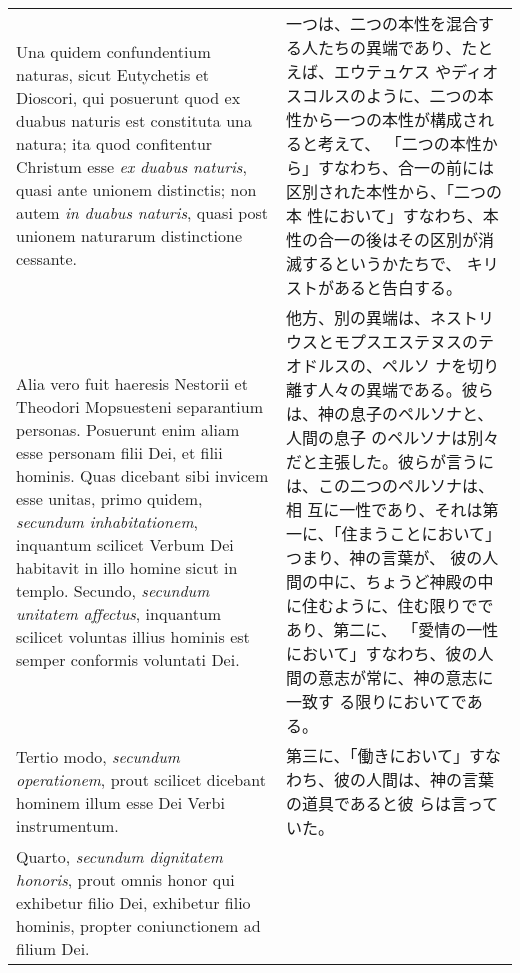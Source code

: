 \documentclass[10pt]{jsarticle} %
\begin{document}
\begin{longtable}{p{21em}p{21em}}
\\

Una quidem confundentium naturas, sicut Eutychetis et Dioscori, qui
posuerunt quod ex duabus naturis est constituta una natura; ita quod
confitentur Christum esse {\itshape ex duabus naturis}, quasi ante
unionem distinctis; non autem {\itshape in duabus naturis}, quasi post
unionem naturarum distinctione cessante.

&

一つは、二つの本性を混合する人たちの異端であり、たとえば、エウテュケス
やディオスコルスのように、二つの本性から一つの本性が構成されると考えて、
「二つの本性から」すなわち、合一の前には区別された本性から、「二つの本
性において」すなわち、本性の合一の後はその区別が消滅するというかたちで、
キリストがあると告白する。

\\

Alia vero fuit haeresis Nestorii et Theodori Mopsuesteni separantium
personas. Posuerunt enim aliam esse personam filii Dei, et filii
hominis. Quas dicebant sibi invicem esse unitas, primo quidem,
{\itshape secundum inhabitationem}, inquantum scilicet Verbum Dei
habitavit in illo homine sicut in templo. Secundo, {\itshape secundum
unitatem affectus}, inquantum scilicet voluntas illius hominis est
semper conformis voluntati Dei.


&

他方、別の異端は、ネストリウスとモプスエステヌスのテオドルスの、ペルソ
ナを切り離す人々の異端である。彼らは、神の息子のペルソナと、人間の息子
のペルソナは別々だと主張した。彼らが言うには、この二つのペルソナは、相
互に一性であり、それは第一に、「住まうことにおいて」つまり、神の言葉が、
彼の人間の中に、ちょうど神殿の中に住むように、住む限りでであり、第二に、
「愛情の一性において」すなわち、彼の人間の意志が常に、神の意志に一致す
る限りにおいてである。

\\

Tertio modo, {\itshape secundum operationem}, prout scilicet dicebant
hominem illum esse Dei Verbi instrumentum.



&


第三に、「働きにおいて」すなわち、彼の人間は、神の言葉の道具であると彼
らは言っていた。

\\

Quarto, {\itshape secundum dignitatem honoris}, prout omnis honor qui
exhibetur filio Dei, exhibetur filio hominis, propter coniunctionem ad
filium Dei.


\end{longtable}
\end{document}
